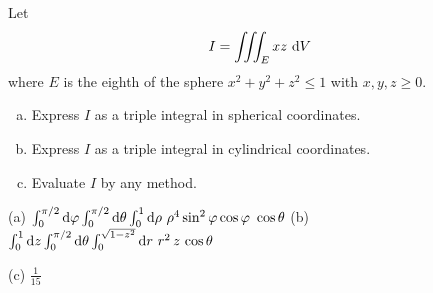 \begin{question}[M200 2009D] %
Let
\begin{align*}
I = \iiint_E xz\ \mathrm{d}V
\end{align*}
where $E$ is the eighth of the sphere $x^2+y^2+z^2\le 1$ with
$x,y,z\ge 0$.
\begin{enumerate}[(a)]
\item
Express $I$ as a triple integral in spherical coordinates.

\item
Express $I$ as a triple integral in cylindrical coordinates.

\item
Evaluate $I$ by any method.
\end{enumerate}
\end{question}

%

\begin{answer}
(a) $\int_0^{\pi/2}\dee{\varphi}\int_0^{\pi/2}\dee{\theta}\int_0^1\dee{\rho}\ 
         \rho^4\sin^2\varphi\cos\varphi\ \cos\theta$\qquad
(b) $\int_0^1\dee{z}\int_0^{\pi/2}\dee{\theta}\int_0^{\sqrt{1-z^2}}\dee{r} \ 
         r^2\,z\,\cos\theta$

(c) $\frac{1}{15}$
\end{answer}

